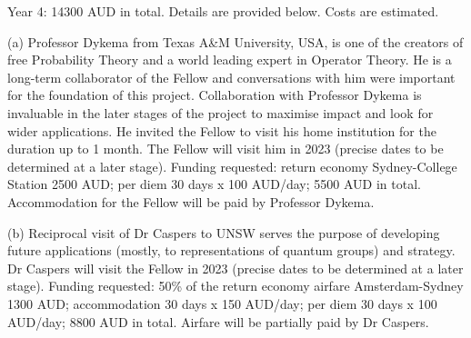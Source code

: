 \documentclass[12pt]{article}
\begin{document}
Year 4: 14300 AUD in total. Details are provided below. Costs are estimated.

(a) Professor Dykema from Texas A\&M University, USA, is one of the creators of free Probability Theory and a world leading expert in Operator Theory. He is a long-term collaborator of the Fellow and conversations with him were important for the foundation of this project. Collaboration with Professor Dykema is invaluable in the later stages of the project to maximise impact and look for wider applications. He invited the Fellow to visit his home institution for the duration up to 1 month. The Fellow will visit him in 2023 (precise dates to be determined at a later stage). Funding requested: return economy Sydney-College Station 2500 AUD; per diem 30 days x 100 AUD/day; 5500 AUD in total. Accommodation for the Fellow will be paid by Professor Dykema.

(b) Reciprocal visit of Dr Caspers to UNSW serves the purpose of developing future applications (mostly, to representations of quantum groups) and strategy. Dr Caspers will visit the Fellow in 2023 (precise dates to be determined at a later stage). Funding requested: 50\% of the return economy airfare Amsterdam-Sydney 1300 AUD; accommodation 30 days x 150 AUD/day; per diem 30 days x 100 AUD/day; 8800 AUD in total. Airfare will be partially paid by Dr Caspers.
\end{document}
